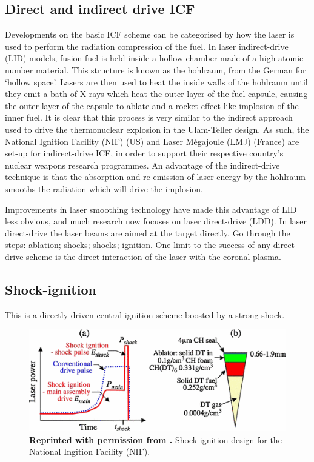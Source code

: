 \subsection{Direct and indirect drive ICF}
Developments on the basic ICF scheme can be categorised by how the laser is used to perform the radiation compression of the fuel. In laser indirect-drive (\acrshort{LID}) models, fusion fuel is held inside a hollow chamber made of a high atomic number material. This structure is known as the hohlraum, from the German for `hollow space'. Lasers are then used to heat the inside walls of the hohlraum until they emit a bath of X-rays which heat the outer layer of the fuel capsule, causing the outer layer of the capsule to ablate and a rocket-effect-like implosion of the inner fuel. It is clear that this process is very similar to the indirect approach used to drive the thermonuclear explosion in the Ulam-Teller design. As such, the National Ignition Facility (\acrshort{NIF}) (US) and Laser M\'{e}gajoule (\acrshort{LMJ}) (France) are set-up for indirect-drive ICF, in order to support their respective country's nuclear weapons research programmes. An advantage of the indirect-drive technique is that the absorption and re-emission of laser energy by the hohlraum smooths the radiation which will drive the implosion.

Improvements in laser smoothing technology have made this advantage of \acrshort{LID} less obvious, and much research now focuses on laser direct-drive (\acrshort{LDD}). In laser direct-drive the laser beams are aimed at the target directly. Go through the steps: ablation; shocks; shocks; ignition. One limit to the success of any direct-drive scheme is the direct interaction of the laser with the coronal plasma. 





\subsection{Shock-ignition}
 This is a directly-driven central ignition scheme boosted by a strong shock.

\begin{figure}
 \centering
 \includegraphics[width=0.9\columnwidth]{Chapters/C1_Introduction/SI_profile.png}
 \caption{\textbf{Reprinted with permission from \citet{Perkins2009}.} Shock-ignition design for the National Ingition Facility (NIF).} \label{fig:SI_laser}
\end{figure}



